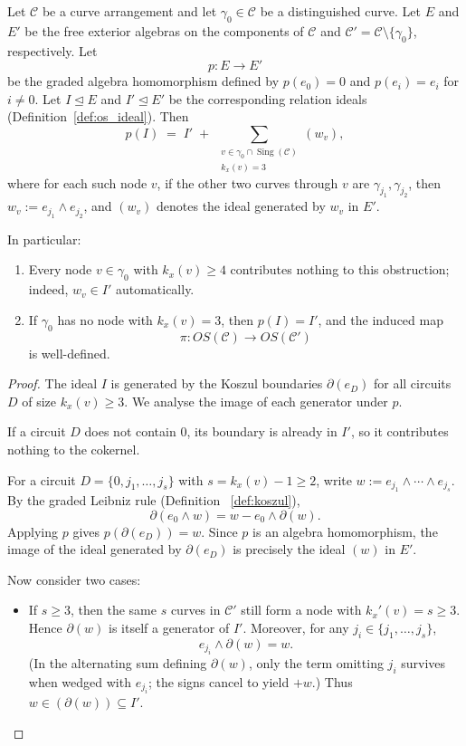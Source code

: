 \documentclass[article,11pt]{amsart} \numberwithin{equation}{section}
\numberwithin{equation}{section}
\begin{document}
{\begin{lm}
	\label{lem:image_of_I}
	Let $\mathcal C$ be a curve arrangement and let $\gamma_0\in\mathcal C$ be a distinguished curve. Let $E$ and $E'$ be the free exterior algebras on the components of $\mathcal C$ and $\mathcal C'=\mathcal C\setminus\{\gamma_0\}$, respectively. Let
	\[
	p: E \longrightarrow E'
	\]
	be the graded algebra homomorphism defined by $p(e_0)=0$ and $p(e_i)=e_i$ for $i\ne 0$. Let $I\unlhd E$ and $I'\unlhd E'$ be the corresponding relation ideals (Definition~\ref{def:os_ideal}). Then
	\[
	p(I) \;=\; I' \;+\; \sum_{\substack{v\in\gamma_0\cap\operatorname{Sing}(\mathcal C)\\ k_x(v)=3}} (w_v),
	\]
	where for each such node $v$, if the other two curves through $v$ are $\gamma_{j_1},\gamma_{j_2}$, then $w_v:=e_{j_1}\wedge e_{j_2}$, and $(w_v)$ denotes the ideal generated by $w_v$ in $E'$.
	
	In particular:
	\begin{enumerate}
		\item Every node $v\in\gamma_0$ with $k_x(v)\ge 4$ contributes nothing to this obstruction; indeed, $w_v\in I'$ automatically.
		\item If $\gamma_0$ has no node with $k_x(v)=3$, then $p(I)=I'$, and the induced map
		\[
		\pi: OS(\mathcal C) \longrightarrow OS(\mathcal C')
		\]
		is well-defined.
	\end{enumerate}
\end{lm}

\begin{proof}
	The ideal $I$ is generated by the Koszul boundaries $\partial(e_D)$ for all circuits $D$ of size $k_x(v)\ge 3$. We analyse the image of each generator under $p$.
	
	If a circuit $D$ does not contain $0$, its boundary is already in $I'$, so it contributes nothing to the cokernel.
	
	For a circuit $D=\{0,j_1,\dots,j_s\}$ with $s=k_x(v)-1\ge 2$, write $w:=e_{j_1}\wedge\cdots\wedge e_{j_s}$. By the graded Leibniz rule (Definition~ \ref{def:koszul}),
	\[
	\partial(e_0\wedge w) = w - e_0\wedge \partial(w).
	\]
	Applying $p$ gives $p(\partial(e_D))=w$. Since $p$ is an algebra homomorphism, the image of the ideal generated by $\partial(e_D)$ is precisely the ideal $(w)$ in $E'$.
	
	Now consider two cases:
	\begin{itemize}
		\item If $s\ge 3$, then the same $s$ curves in $\mathcal C'$ still form a node with $k_x'(v)=s\ge 3$. Hence $\partial(w)$ is itself a generator of $I'$. Moreover, for any $j_i\in\{j_1,\dots,j_s\}$,
		\[
		e_{j_i}\wedge \partial(w) = w.
		\]
		(In the alternating sum defining $\partial(w)$, only the term omitting $j_i$ survives when wedged with $e_{j_i}$; the signs cancel to yield $+w$.) Thus $w\in(\partial(w))\subseteq I'$.
		

\end{itemize}
\end{proof}}
\end{document}
